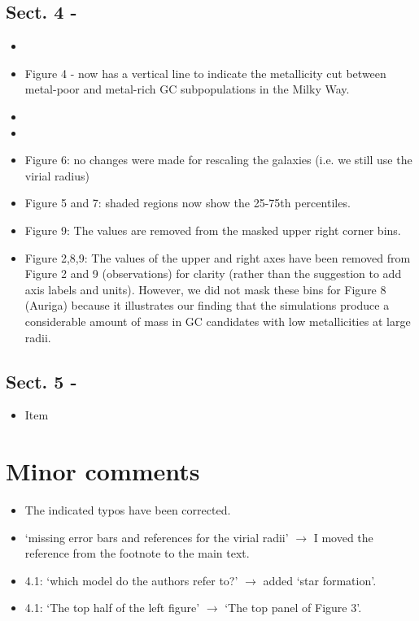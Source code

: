 \documentclass{article}
\begin{document}
\subsection*{Sect. 4 -}
\begin{itemize}
\item
\item Figure 4 - now has a vertical line to indicate the metallicity cut 
between metal-poor and metal-rich GC subpopulations in the Milky Way.
\item
\item
\item Figure 6: no changes were made for rescaling the galaxies (i.e. we still
use the virial radius)
\item Figure 5 and 7: shaded regions now show the 25-75th percentiles.
\item Figure 9: The values are removed from the masked upper right corner bins.
\item Figure 2,8,9: The values of the upper and right axes have been removed from
Figure 2 and 9 (observations) for clarity (rather than the suggestion to add 
axis labels and units). However, we did not mask these bins for Figure 8 (Auriga)
because it illustrates our finding that the simulations produce a considerable
amount of mass in GC candidates with low metallicities at large radii.
\end{itemize}

\subsection*{Sect. 5 -}
\begin{itemize}
\item Item
\end{itemize}



\section*{Minor comments}
\begin{itemize}
\item The indicated typos have been corrected.
\item `missing error bars and references for the virial radii' $\rightarrow$
    I moved the reference from the footnote to the main text.
\item 4.1: `which model do the authors refer to?' $\rightarrow$ 
    added `star formation'.
\item 4.1: `The top half of the left figure' $\rightarrow$ 
    `The top panel of Figure 3'.
\end{itemize}
\end{document}
